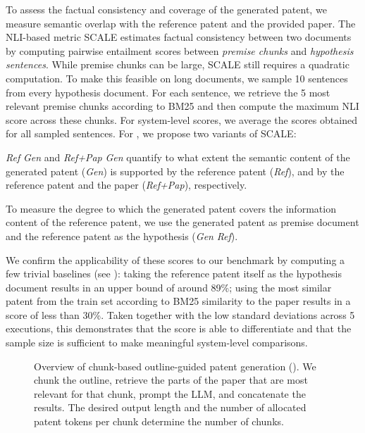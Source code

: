 To assess the factual consistency and coverage of the generated patent, we measure semantic overlap with the reference patent and the provided paper.
The NLI-based metric SCALE \cite{lattimerFastAccurateFactual2023} estimates factual consistency between two documents by computing pairwise entailment scores between \textit{premise chunks} and \textit{hypothesis sentences}.
While premise chunks can be large, SCALE still requires a quadratic computation.
To make this feasible on long documents, we sample 10 sentences from every hypothesis document.
For each sentence, we retrieve the 5 most relevant premise chunks according to BM25 and then compute the maximum NLI score across these chunks.
For system-level scores, we average the scores obtained for all sampled sentences.
For \DatasetName, we propose two variants of SCALE: %

\begin{description}[topsep=7pt,itemsep=7pt]
    \item[Factuality.] \textit{Ref} \textrightarrow{} \textit{Gen} and \textit{Ref+Pap} \textrightarrow{} \textit{Gen} quantify to what extent the semantic content of the generated patent (\textit{Gen}) is supported by the reference patent (\textit{Ref}), and by the reference patent and the paper (\textit{Ref+Pap}), respectively. %
    \item[Coverage.] To measure the degree to which the generated patent covers the information content of the reference patent, we use the generated patent as premise document and the reference patent as the hypothesis (\textit{Gen} \textrightarrow{} \textit{Ref}). %
\end{description}

\noindent We confirm the applicability of these scores to our benchmark by computing a few trivial baselines (see ): taking the reference patent itself as the hypothesis document results in an upper bound of around 89\%; using the most similar patent from the train set according to BM25 similarity to the paper
results in a score of less than 30\%.
Taken together with the low standard deviations across 5 executions, this demonstrates that the score is able to differentiate and that the sample size is sufficient to make meaningful system-level comparisons.


\begin{figure}[t]
  \centering
  
  \caption{
    Overview of chunk-based outline-guided patent generation (\MethodName). 
    We chunk the outline, retrieve the parts of the paper that are most relevant for that chunk, prompt the LLM, and concatenate the results.
    The desired output length and the number of allocated patent tokens per chunk determine the number of chunks.
  }
  \label{fig:generation_approach}
\end{figure}

